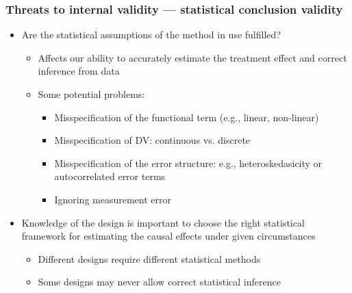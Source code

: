 \documentclass[10pt]{article}
\begin{document}
\subsubsection{Threats to internal validity --- statistical conclusion validity}
\begin{itemize}
    \item Are the statistical assumptions of the method in use fulfilled?
    \begin{itemize}
        \item Affects our ability to accurately estimate the treatment effect and correct inference from data 
        \item Some potential problems: 
        \begin{itemize}
            \item Misspecification of the functional term (e.g., linear, non-linear)
            \item Misspecification of DV: continuous vs. discrete 
            \item Misspecification of the error structure: e.g., heteroskedasicity or autocorrelated error terms 
            \item Ignoring measurement error 
        \end{itemize}
    \end{itemize}
    \item Knowledge of the design is important to choose the right statistical framework for estimating the causal effects under given circumstances 
    \begin{itemize}
        \item Different designs require different statistical methods 
        \item Some designs may never allow correct statistical inference 
    \end{itemize}
\end{itemize}
\newpage 
\end{document}
